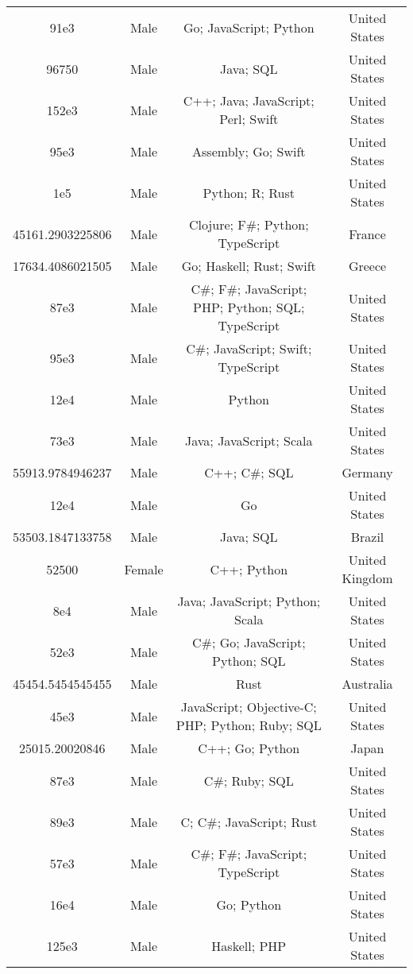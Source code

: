 \begin{center}
\begin{tabular}{ |c|c|c|c| }
91e3  &  Male  &  Go; JavaScript; Python  &  United States  \\ 
96750  &  Male  &  Java; SQL  &  United States  \\ 
152e3  &  Male  &  C++; Java; JavaScript; Perl; Swift  &  United States  \\ 
95e3  &  Male  &  Assembly; Go; Swift  &  United States  \\ 
1e5  &  Male  &  Python; R; Rust  &  United States  \\ 
45161.2903225806  &  Male  &  Clojure; F\#; Python; TypeScript  &  France  \\ 
17634.4086021505  &  Male  &  Go; Haskell; Rust; Swift  &  Greece  \\ 
87e3  &  Male  &  C\#; F\#; JavaScript; PHP; Python; SQL; TypeScript  &  United States  \\ 
95e3  &  Male  &  C\#; JavaScript; Swift; TypeScript  &  United States  \\ 
12e4  &  Male  &  Python  &  United States  \\ 
73e3  &  Male  &  Java; JavaScript; Scala  &  United States  \\ 
55913.9784946237  &  Male  &  C++; C\#; SQL  &  Germany  \\ 
12e4  &  Male  &  Go  &  United States  \\ 
53503.1847133758  &  Male  &  Java; SQL  &  Brazil  \\ 
52500  &  Female  &  C++; Python  &  United Kingdom  \\ 
8e4  &  Male  &  Java; JavaScript; Python; Scala  &  United States  \\ 
52e3  &  Male  &  C\#; Go; JavaScript; Python; SQL  &  United States  \\ 
45454.5454545455  &  Male  &  Rust  &  Australia  \\ 
45e3  &  Male  &  JavaScript; Objective-C; PHP; Python; Ruby; SQL  &  United States  \\ 
25015.20020846  &  Male  &  C++; Go; Python  &  Japan  \\ 
87e3  &  Male  &  C\#; Ruby; SQL  &  United States  \\ 
89e3  &  Male  &  C; C\#; JavaScript; Rust  &  United States  \\ 
57e3  &  Male  &  C\#; F\#; JavaScript; TypeScript  &  United States  \\ 
16e4  &  Male  &  Go; Python  &  United States  \\ 
125e3  &  Male  &  Haskell; PHP  &  United States  \\ 

\end{tabular}
\end{center}
